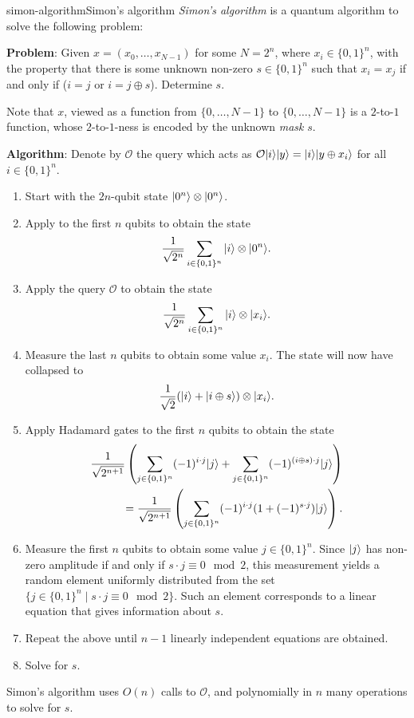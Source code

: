 \begin{topic}{simon-algorithm}{Simon's algorithm}
    \emph{Simon's algorithm} is a quantum algorithm to solve the following problem:

    \textbf{Problem}: Given $x = (x_0, \ldots, x_{N - 1})$ for some $N = 2^n$, where $x_i \in \{ 0, 1 \}^n$, with the property that there is some unknown non-zero $s \in \{ 0, 1 \}^n$ such that $x_i = x_j$ if and only if ($i = j$ or $i = j \oplus s$). Determine $s$.

    Note that $x$, viewed as a function from $\{ 0, \ldots, N - 1 \}$ to $\{ 0, \ldots, N - 1 \}$ is a $2$-to-$1$ function, whose $2$-to-$1$-ness is encoded by the unknown \textit{mask} $s$.

    \textbf{Algorithm}: Denote by $\mathcal{O}$ the query which acts as $\mathcal{O} |i\rangle |y\rangle = |i\rangle |y \oplus x_i\rangle$ for all $i \in \{ 0, 1 \}^n$.
    \begin{enumerate}[label=(\arabic*)]
        \item Start with the $2n$-qubit state $|0^n\rangle \otimes |0^n\rangle$.
        \item Apply  to the first $n$ qubits to obtain the state
        \[ \frac{1}{\sqrt{2^n}} \sum_{i \in \{ 0, 1 \}^n} |i\rangle \otimes |0^n\rangle . \]
        \item Apply the query $\mathcal{O}$ to obtain the state
        \[ \frac{1}{\sqrt{2^n}} \sum_{i \in \{ 0, 1 \}^n} |i\rangle \otimes |x_i\rangle . \]
        \item Measure the last $n$ qubits to obtain some value $x_i$. The state will now have collapsed to
        \[ \frac{1}{\sqrt{2}} (|i\rangle + |i \oplus s\rangle) \otimes |x_i\rangle . \]
        \item Apply Hadamard gates to the first $n$ qubits to obtain the state
        \[ \begin{aligned}
            \frac{1}{\sqrt{2^{n + 1}}} \left( \sum_{j \in \{ 0, 1 \}^n} (-1)^{i \cdot j} |j\rangle + \sum_{j \in \{ 0, 1 \}^n} (-1)^{(i \oplus s) \cdot j} |j\rangle \right) \\
            = \frac{1}{\sqrt{2^{n + 1}}} \left( \sum_{j \in \{ 0, 1 \}^n} (-1)^{i \cdot j} (1 + (-1)^{s \cdot j}) |j\rangle \right) .
        \end{aligned} \]
        \item Measure the first $n$ qubits to obtain some value $j \in \{ 0, 1 \}^n$. Since $|j\rangle$ has non-zero amplitude if and only if $s \cdot j \equiv 0 \mod 2$, this measurement yields a random element uniformly distributed from the set $\{ j \in \{ 0, 1 \}^n \mid s \cdot j \equiv 0 \mod 2 \}$. Such an element corresponds to a linear equation that gives information about $s$.
        \item Repeat the above until $n - 1$ linearly independent equations are obtained.
        \item Solve for $s$.
    \end{enumerate}
    Simon's algorithm uses $O(n)$ calls to $\mathcal{O}$, and polynomially in $n$ many operations to solve for $s$.
\end{topic}

